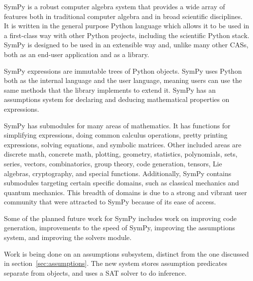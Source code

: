 SymPy is a robust computer algebra system that provides a wide array of
features both in traditional computer algebra and in broad scientific
disciplines. It is written in the general purpose Python language
which allows it to be used in a first-class way with other Python projects,
including the scientific Python stack. SymPy is designed to be used in an
extensible way and, unlike many other CASs, both as an end-user application and
as a library.

SymPy expressions are immutable trees of Python objects. SymPy uses Python both
as the internal language and the user language, meaning users can use the same
methods that the library implements to extend it. SymPy has an assumptions
system for declaring and deducing mathematical properties on expressions.

SymPy has submodules for many areas of mathematics. It has functions for
simplifying expressions, doing common calculus operations, pretty printing
expressions, solving equations, and symbolic matrices. Other included areas
are discrete math, concrete math, plotting, geometry, statistics,
polynomials, sets, series, vectors, combinatorics, group theory, code
generation, tensors, Lie algebras, cryptography, and special functions.
Additionally, SymPy contains submodules targeting certain specific domains,
such as classical mechanics and quantum mechanics.  This breadth of domains is
due to a strong and vibrant user community that were attracted to SymPy because
of its ease of access.


Some of the planned future work for SymPy includes work on improving code
generation, improvements to the speed of SymPy, improving the assumptions
system, and improving the solvers module.


Work is being done on an assumptions subsystem, distinct from the one
discussed in section~\ref{sec:assumptions}. The new system stores assumption
predicates separate from objects, and uses a SAT solver to do inference.


